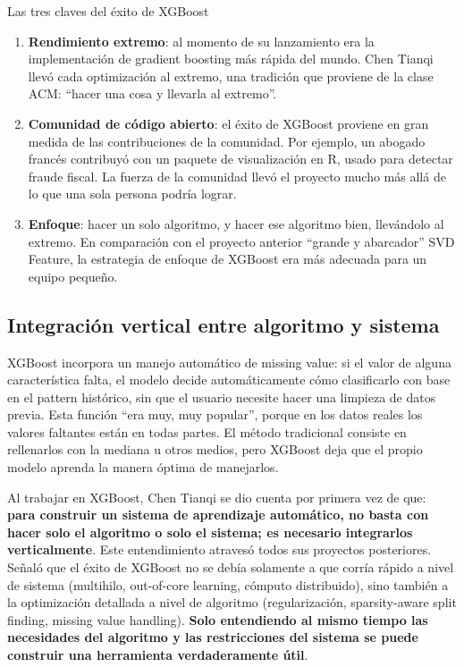 \documentclass[a4paper]{article}
\begin{document}
\begin{importantbox}{Las tres claves del éxito de XGBoost}
\begin{enumerate}
    \item \textbf{Rendimiento extremo}: al momento de su lanzamiento era la implementación de gradient boosting más rápida del mundo. Chen Tianqi llevó cada optimización al extremo, una tradición que proviene de la clase ACM: ``hacer una cosa y llevarla al extremo''.
    \item \textbf{Comunidad de código abierto}: el éxito de XGBoost proviene en gran medida de las contribuciones de la comunidad. Por ejemplo, un abogado francés contribuyó con un paquete de visualización en R, usado para detectar fraude fiscal. La fuerza de la comunidad llevó el proyecto mucho más allá de lo que una sola persona podría lograr.
    \item \textbf{Enfoque}: hacer un solo algoritmo, y hacer ese algoritmo bien, llevándolo al extremo. En comparación con el proyecto anterior ``grande y abarcador'' SVD Feature, la estrategia de enfoque de XGBoost era más adecuada para un equipo pequeño.
\end{enumerate}
\end{importantbox}

\subsection{Integración vertical entre algoritmo y sistema}

XGBoost incorpora un manejo automático de missing value: si el valor de alguna característica falta, el modelo decide automáticamente cómo clasificarlo con base en el pattern histórico, sin que el usuario necesite hacer una limpieza de datos previa. Esta función ``era muy, muy popular'', porque en los datos reales los valores faltantes están en todas partes. El método tradicional consiste en rellenarlos con la mediana u otros medios, pero XGBoost deja que el propio modelo aprenda la manera óptima de manejarlos.

Al trabajar en XGBoost, Chen Tianqi se dio cuenta por primera vez de que: \textbf{para construir un sistema de aprendizaje automático, no basta con hacer solo el algoritmo o solo el sistema; es necesario integrarlos verticalmente}. Este entendimiento atravesó todos sus proyectos posteriores. Señaló que el éxito de XGBoost no se debía solamente a que corría rápido a nivel de sistema (multihilo, out-of-core learning, cómputo distribuido), sino también a la optimización detallada a nivel de algoritmo (regularización, sparsity-aware split finding, missing value handling). \textbf{Solo entendiendo al mismo tiempo las necesidades del algoritmo y las restricciones del sistema se puede construir una herramienta verdaderamente útil}.
\end{document}
